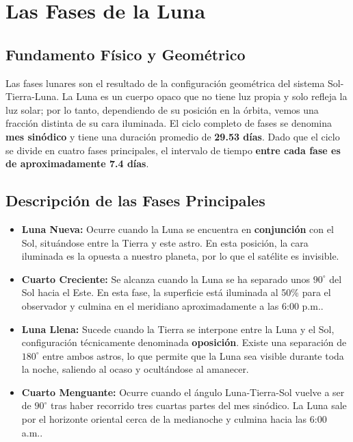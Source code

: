 \documentclass[a4paper]{article}
\begin{document}
\section{Las Fases de la Luna}

\subsection{Fundamento Físico y Geométrico}

Las fases lunares son el resultado de la configuración geométrica del sistema Sol-Tierra-Luna. La Luna es un cuerpo opaco que no tiene luz propia y solo refleja la luz solar; por lo tanto, dependiendo de su posición en la órbita, vemos una fracción distinta de su cara iluminada. El ciclo completo de fases se denomina \textbf{mes sinódico} y tiene una duración promedio de \textbf{29.53 días}. Dado que el ciclo se divide en cuatro fases principales, el intervalo de tiempo \textbf{entre cada fase es de aproximadamente 7.4 días}.

\subsection{Descripción de las Fases Principales}

\begin{itemize}
    \item \textbf{Luna Nueva:} Ocurre cuando la Luna se encuentra en \textbf{conjunción} con el Sol, situándose entre la Tierra y este astro. En esta posición, la cara iluminada es la opuesta a nuestro planeta, por lo que el satélite es invisible.
    \item \textbf{Cuarto Creciente:} Se alcanza cuando la Luna se ha separado unos $90^\circ$ del Sol hacia el Este. En esta fase, la superficie está iluminada al 50\% para el observador y culmina en el meridiano aproximadamente a las 6:00 p.m..
    \item \textbf{Luna Llena:} Sucede cuando la Tierra se interpone entre la Luna y el Sol, configuración técnicamente denominada \textbf{oposición}. Existe una separación de $180^\circ$ entre ambos astros, lo que permite que la Luna sea visible durante toda la noche, saliendo al ocaso y ocultándose al amanecer.
    \item \textbf{Cuarto Menguante:} Ocurre cuando el ángulo Luna-Tierra-Sol vuelve a ser de $90^\circ$ tras haber recorrido tres cuartas partes del mes sinódico. La Luna sale por el horizonte oriental cerca de la medianoche y culmina hacia las 6:00 a.m..
\end{itemize}
\end{document}
